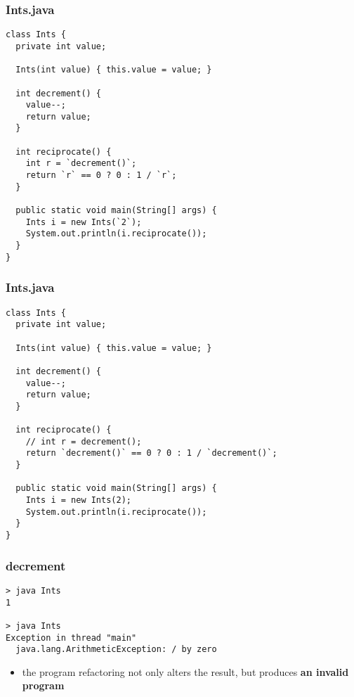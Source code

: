 \begin{frame}[fragile]
\frametitle{Ints.java}
\begin{lstlisting}[style=java]
class Ints {
  private int value;

  Ints(int value) { this.value = value; }

  int decrement() {
    value--;
    return value;
  }

  int reciprocate() {
    int r = `decrement()`;
    return `r` == 0 ? 0 : 1 / `r`;
  }

  public static void main(String[] args) {
    Ints i = new Ints(`2`);
    System.out.println(i.reciprocate());
  }
}
\end{lstlisting}
\end{frame}

\begin{frame}[fragile]
\frametitle{Ints.java}
\begin{lstlisting}[style=java]
class Ints {
  private int value;

  Ints(int value) { this.value = value; }

  int decrement() {
    value--;
    return value;
  }

  int reciprocate() {
    // int r = decrement();
    return `decrement()` == 0 ? 0 : 1 / `decrement()`;
  }

  public static void main(String[] args) {
    Ints i = new Ints(2);
    System.out.println(i.reciprocate());
  }
}
\end{lstlisting}
\end{frame}

\begin{frame}[fragile]
\frametitle{decrement}
\begin{block}{}
\begin{lstlisting}
> java Ints
1

> java Ints
Exception in thread "main"
  java.lang.ArithmeticException: / by zero
\end{lstlisting}
\end{block}
\begin{itemize}
  \item<1> the program refactoring not only alters the result, but produces \textbf{an invalid program}
\end{itemize}
\end{frame}